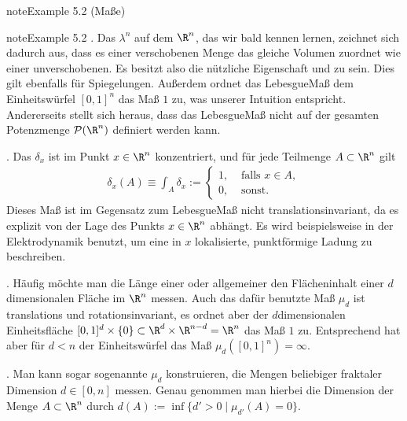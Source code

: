 \documentclass[letterpaper,10pt,english]{jupyterBook}
\begin{document}
\begin{sphinxadmonition}{note}{Example 5.2 (Maße)}
\begin{sphinxadmonition}{note}{Example 5.2}
. Das  \(\lambda^n\) auf dem \(\R^n\), das wir bald kennen lernen, zeichnet sich dadurch aus, dass es einer verschobenen Menge das gleiche Volumen zuordnet wie einer unverschobenen.
Es besitzt also die nützliche Eigenschaft  und  zu sein.
Dies gilt ebenfalls für Spiegelungen.
Außerdem ordnet das Lebesgue\sphinxhyphen{}Maß dem Einheitswürfel \([0,1]^n\) das Maß \(1\) zu, was unserer Intuition entspricht.
Andererseits stellt sich heraus, dass das Lebesgue\sphinxhyphen{}Maß nicht auf der gesamten Potenzmenge \(\mathcal{P}(\R^n)\) definiert werden kann.

. Das  \(\delta_x\) ist im Punkt \(x \in \R^n\) konzentriert, und für jede Teilmenge \(A\subset\R^n\) gilt
\begin{equation*}
\begin{split}\delta_x(A) \equiv \int_A\delta_x := \begin{cases} 1, &  \text{ falls } x \in A,\\ 0, & \text{ sonst}. \end{cases}\end{split}
\end{equation*}
\sphinxAtStartPar
Dieses Maß ist im Gegensatz zum Lebesgue\sphinxhyphen{}Maß nicht translationsinvariant, da es explizit von der Lage des Punkts \(x\in\R^n\) abhängt.
Es wird beispielsweise in der Elektrodynamik benutzt, um eine in \(x\) lokalisierte, punktförmige Ladung zu beschreiben.

. Häufig möchte man die Länge einer  oder allgemeiner den Flächeninhalt einer \(d\)\sphinxhyphen{}dimensionalen Fläche im \(\R^n\) messen.
Auch das dafür benutzte Maß \(\mu_d\) ist translations\sphinxhyphen{} und rotationsinvariant, es ordnet aber der \(d\)\sphinxhyphen{}dimensionalen Einheitsfläche \([0,1]^d\times\{0\} \subset\R^d\times\R^{n-d}=\R^n\) das Maß \(1\) zu.
Entsprechend hat aber für \(d<n\) der Einheitswürfel das Maß \(\mu_d([0,1]^n)=\infty\).

. Man kann sogar sogenannte  \(\mu_d\) konstruieren, die Mengen beliebiger fraktaler Dimension \(d\in[0,n]\) messen.
Genau genommen  man hierbei die Dimension der Menge \(A\subset \R^n\) durch \(d(A):=\inf\{d'>0\mid \mu_{d'}(A)=0\}.\)


\end{sphinxadmonition}
\end{sphinxadmonition}
\end{document}
